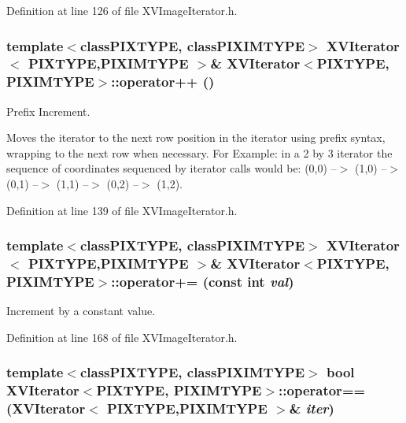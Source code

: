 Definition at line 126 of file XVImage\-Iterator.h.\label{XVIterator_a9}
\hypertarget{class_XVIterator_a9}{
\subsubsection[operator++]{\setlength{\rightskip}{0pt plus 5cm}template$<$classPIXTYPE, classPIXIMTYPE$>$ XVIterator$<$ PIXTYPE,PIXIMTYPE $>$\& XVIterator$<$PIXTYPE, PIXIMTYPE$>$::operator++ ()}}


Prefix Increment.

Moves the iterator to the next row position in the iterator using prefix syntax, wrapping to the next row when necessary. For Example: in a 2 by 3 iterator the sequence of coordinates sequenced by iterator calls would be: (0,0) --$>$ (1,0) --$>$ (0,1) --$>$ (1,1) --$>$ (0,2) --$>$ (1,2). 

Definition at line 139 of file XVImage\-Iterator.h.\label{XVIterator_a10}
\hypertarget{class_XVIterator_a10}{
\subsubsection[operator+=]{\setlength{\rightskip}{0pt plus 5cm}template$<$classPIXTYPE, classPIXIMTYPE$>$ XVIterator$<$ PIXTYPE,PIXIMTYPE $>$\& XVIterator$<$PIXTYPE, PIXIMTYPE$>$::operator+= (const int {\em val})}}


Increment by a constant value.



Definition at line 168 of file XVImage\-Iterator.h.\label{XVIterator_a11}
\hypertarget{class_XVIterator_a11}{
\subsubsection[operator==]{\setlength{\rightskip}{0pt plus 5cm}template$<$classPIXTYPE, classPIXIMTYPE$>$ bool XVIterator$<$PIXTYPE, PIXIMTYPE$>$::operator== (XVIterator$<$ PIXTYPE,PIXIMTYPE $>$\& {\em iter})}}



